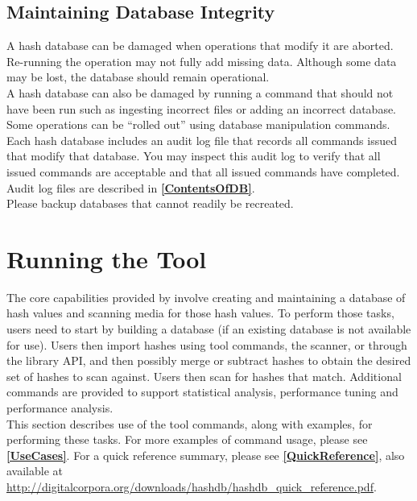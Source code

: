 \documentclass[11pt,fleqn]{article} %
\begin{document}
\subsection{Maintaining Database Integrity}
A \hdb hash database can be damaged when operations that modify it are aborted. Re-running the operation may not fully add missing data. Although some data may be lost, the database should remain operational.\\

A \hdb hash database can also be damaged by running a command that should not have been run such as ingesting incorrect files or adding an incorrect database. Some operations can be ``rolled out'' using database manipulation commands.\\

Each \hdb hash database includes an audit log file that records all commands issued that modify that database. You may inspect this audit log to verify that all issued commands are acceptable and that all issued commands have completed. Audit log files are described in \textbf{\autoref{ContentsOfDB}}.\\

Please backup databases that cannot readily be recreated.

\section {Running the \hdb Tool}
\label{Running}
The core capabilities provided by \hdb involve creating and maintaining a database of hash values and scanning media for those hash values. To perform those tasks, \hdb users need to start by building a database (if an existing database is not available for use).
Users then import hashes using \hdb tool commands, the \hdb \bulk scanner, or through the \hdb library API, and then possibly merge or subtract hashes to obtain the desired set of hashes to scan against.
Users then scan for hashes that match.
Additional commands are provided to support statistical analysis, performance tuning and performance analysis.\\

This section describes use of the \hdb tool commands, along with examples, for performing these tasks.
For more examples of command usage, please see \textbf{\autoref{UseCases}}.
For a \hdb quick reference summary, please see \textbf{\autoref{QuickReference}}, also available at \url{http://digitalcorpora.org/downloads/hashdb/hashdb_quick_reference.pdf}.
\end{document}
